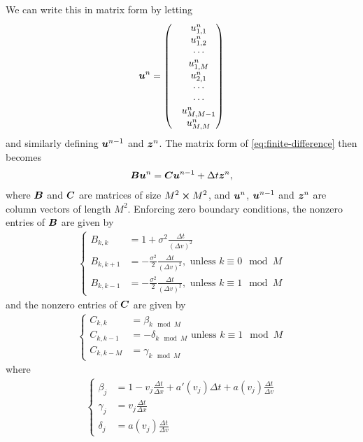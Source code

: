 \documentclass{article}  %
\begin{document}
We can write this in matrix form by letting 
%
\begin{align} 
    \boldsymbol{u}^n = 
    \begin{pmatrix}
        &u^n_{1,1}\\
        & u^n_{1,2}\\
        & \cdots \\
        &u^n_{1,M}\\
        &u^n_{2,1}\\
        & \cdots \\ 
        & \cdots \\ 
        &u^n_{M,M-1}\\
        &u^n_{M,M} 
    \end{pmatrix}
\end{align}
%
and similarly defining $\boldsymbol{u}^{n-1}$ and $\boldsymbol{z}^n$. The matrix form of \autoref{eq:finite-difference} then becomes 
%
\begin{align} 
    \label{eq:fd-matrix}
    \boldsymbol{B} \boldsymbol{u}^n = \boldsymbol{C} \boldsymbol{u}^{n-1} + \Delta t \boldsymbol{z}^n,
\end{align}
%
where $\boldsymbol{B}$ and $\boldsymbol{C}$ are matrices of size $M^2 \cross M^2$, and $\boldsymbol{u}^n$, $\boldsymbol{u}^{n-1}$ and $\boldsymbol{z}^n$ are column vectors of length $M^2$. Enforcing zero boundary conditions, the nonzero entries of $\boldsymbol{B}$ are given by
%
\begin{align} 
    \begin{cases} 
        B_{k,k} &= 1 + \sigma^2 \frac{\Delta t}{(\Delta v)^2}\\
        B_{k,k+1} &= - \frac{\sigma^2}{2} \frac{\Delta t}{(\Delta v)^2},\text{ unless } k \equiv 0 \mod M\\ 
        B_{k,k-1} &= - \frac{\sigma^2}{2} \frac{\Delta t}{(\Delta v)^2},\text{ unless } k \equiv 1 \mod M
    \end{cases}
\end{align}
%
and the nonzero entries of $\boldsymbol{C}$ are given by 
%
\begin{align} 
    \begin{cases}
        C_{k,k} &= \beta_{k \mod M}\\
        C_{k,k-1} &= - \delta_{k \mod M}\text{ unless } k \equiv 1 \mod M\\
        C_{k,k-M} &= \gamma_{k \mod M}
    \end{cases}
\end{align}
%
where 
%
\begin{align} 
    \begin{cases} 
        \beta_j &= 1 - v_j \frac{\Delta t}{\Delta x} + a'(v_j)\Delta t + a(v_j)\frac{\Delta t}{\Delta v}\\
        \gamma_j &= v_j \frac{\Delta t}{\Delta x} \\
        \delta_j &= a(v_j)\frac{\Delta t}{\Delta v}
    \end{cases}
\end{align}
%
\end{document}
